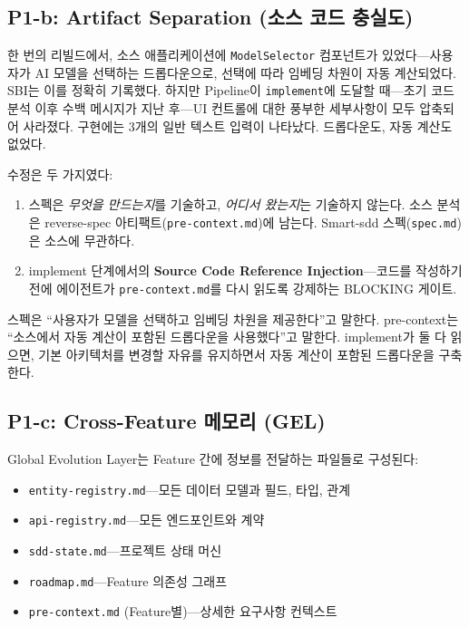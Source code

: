 \documentclass[11pt,a4paper,openright,twoside]{report}
\newcommand{\file}[1]{\texttt{#1}}
\begin{document}
\subsection{P1-b: Artifact Separation (소스 코드 충실도)}

한 번의 리빌드에서, 소스 애플리케이션에 \texttt{ModelSelector} 컴포넌트가 있었다---사용자가 AI 모델을 선택하는 드롭다운으로, 선택에 따라 임베딩 차원이 자동 계산되었다. SBI는 이를 정확히 기록했다. 하지만 Pipeline이 \texttt{implement}에 도달할 때---초기 코드 분석 이후 수백 메시지가 지난 후---UI 컨트롤에 대한 풍부한 세부사항이 모두 압축되어 사라졌다. 구현에는 3개의 일반 텍스트 입력이 나타났다. 드롭다운도, 자동 계산도 없었다.

수정은 두 가지였다:

\begin{enumerate}
  \item 스펙은 \emph{무엇을 만드는지}를 기술하고, \emph{어디서 왔는지}는 기술하지 않는다. 소스 분석은 reverse-spec 아티팩트(\file{pre-context.md})에 남는다. Smart-sdd 스펙(\file{spec.md})은 소스에 무관하다.
  \item implement 단계에서의 \textbf{Source Code Reference Injection}---코드를 작성하기 전에 에이전트가 \file{pre-context.md}를 다시 읽도록 강제하는 BLOCKING 게이트.
\end{enumerate}

스펙은 ``사용자가 모델을 선택하고 임베딩 차원을 제공한다''고 말한다. pre-context는 ``소스에서 자동 계산이 포함된 드롭다운을 사용했다''고 말한다. implement가 둘 다 읽으면, 기본 아키텍처를 변경할 자유를 유지하면서 자동 계산이 포함된 드롭다운을 구축한다.

\subsection{P1-c: Cross-Feature 메모리 (GEL)}

Global Evolution Layer는 Feature 간에 정보를 전달하는 파일들로 구성된다:

\begin{itemize}
  \item \file{entity-registry.md}---모든 데이터 모델과 필드, 타입, 관계
  \item \file{api-registry.md}---모든 엔드포인트와 계약
  \item \file{sdd-state.md}---프로젝트 상태 머신
  \item \file{roadmap.md}---Feature 의존성 그래프
  \item \file{pre-context.md} (Feature별)---상세한 요구사항 컨텍스트
\end{itemize}
\end{document}
